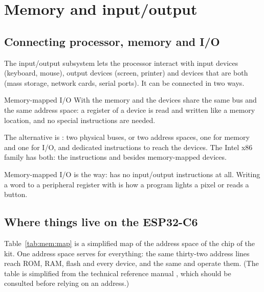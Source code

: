 \section{Memory and input/output}

\subsection{Connecting processor, memory and I/O}

The input/output subsystem lets the processor interact with input devices
(keyboard, mouse), output devices (screen, printer) and devices that are both
(mass storage, network cards, serial ports). It can be connected in two ways.

\begin{definition}{Memory-mapped I/O}
With  the memory and the devices share the same bus
and the same address space: a register of a device is read and written like a
memory location, and no special instructions are needed.
\end{definition}

The alternative is : two physical buses, or two address
spaces, one for memory and one for I/O, and dedicated instructions to reach
the devices. The Intel x86 family has both: the instructions  and
 besides memory-mapped devices.

\begin{prgmachine}
Memory-mapped I/O is the \riscv way: \riscv has no input/output instructions
at all. Writing a word to a peripheral register with  is how a
\riscv program lights a pixel or reads a button.
\end{prgmachine}

\subsection{Where things live on the ESP32-C6}

Table~\ref{tab:mem:map} is a simplified map of the address space of the chip
of the kit. One address space serves for everything: the same thirty-two
address lines reach ROM, RAM, flash and every device, and the same 
and  operate them. (The table is simplified from the technical
reference manual \citep{esp32c6trm}, which should be consulted before relying
on an address.)


